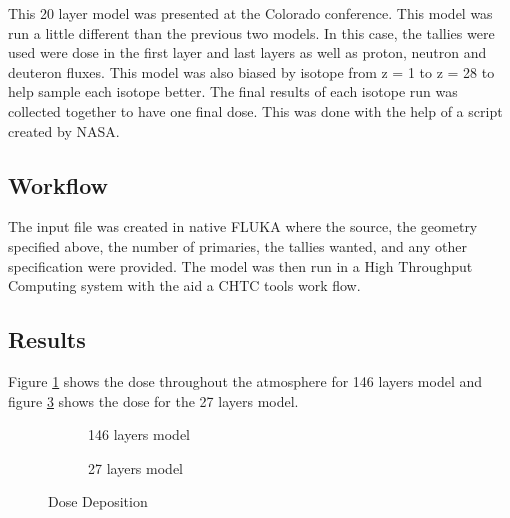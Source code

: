 This 20 layer model was presented at the Colorado conference. This model was run a little
different than the previous two models. In this case, the tallies were used were
dose in the first layer and last layers as well as proton, neutron and deuteron fluxes.
This model was also biased by isotope from z = 1 to z = 28 to help sample each isotope better.
The final results of each isotope run was collected together to have one final dose.
This was done with the help of a script created by NASA.

\subsection*{Workflow}
The input file was created in native FLUKA where the source, the geometry specified above,
the number of primaries, the tallies wanted, and any other specification were provided.
The model was then run in a High Throughput Computing system with the aid a CHTC tools work flow.
\subsection*{Results}
Figure \ref{146} shows the dose throughout the atmosphere for 146 layers model                
and figure \ref{27} shows the dose for the 27 layers model.      
\begin{figure}
\centering
\begin{subfigure}[b]{.45\textwidth}
\caption{146 layers model}
\label{146}
\end{subfigure}
%
\hspace{0.5cm}
%
\begin{subfigure}[b]{.45\textwidth}
\centering
{}
\caption{27 layers model}
\label{27}
\end{subfigure}
\caption{Dose Deposition}
\end{figure}


